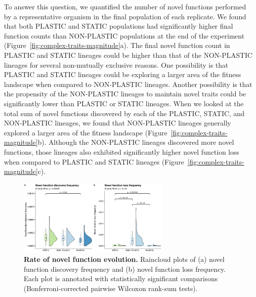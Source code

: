 \documentclass[utf8]{frontiersSCNS} %
\begin{document}
\begin{raggedbottom}
To answer this question, we quantified the number of novel functions performed by a representative organism in the final population of each replicate.
We found that both PLASTIC and STATIC populations had significantly higher final function counts than NON-PLASTIC populations at the end of the experiment (Figure~\ref{fig:complex-traits-magnitude}a).
The final novel function count in PLASTIC and STATIC lineages could be higher than that of the NON-PLASTIC lineages for several non-mutually exclusive reasons.
One possibility is that PLASTIC and STATIC lineages could be exploring a larger area of the fitness landscape when compared to NON-PLASTIC lineages.
Another possibility is that the propensity of the NON-PLASTIC lineages to maintain novel traits could be significantly lower than PLASTIC or STATIC lineages.
When we looked at the total sum of novel functions discovered by each of the PLASTIC, STATIC, and NON-PLASTIC lineages, we found that NON-PLASTIC lineages generally explored a larger area of the fitness landscape (Figure~\ref{fig:complex-traits-magnitude}b).
Although the NON-PLASTIC lineages discovered more novel functions, those lineages also exhibited significantly higher novel function loss when compared to PLASTIC and STATIC lineages (Figure~\ref{fig:complex-traits-magnitude}c).

\begin{figure}[h!]
  \centering
  \includegraphics[width=0.66\textwidth]{media-complex-traits-pace-panel.pdf}
  \caption{\small
  \textbf{Rate of novel function evolution.}
  Raincloud plots of
  (a) novel function discovery frequency
  and (b) novel function loss frequency.
  Each plot is annotated with statistically significant comparisons (Bonferroni-corrected pairwise Wilcoxon rank-sum tests).
  }
  \label{fig:complex-traits-rate}
\end{figure}


\end{raggedbottom}
\end{document}
